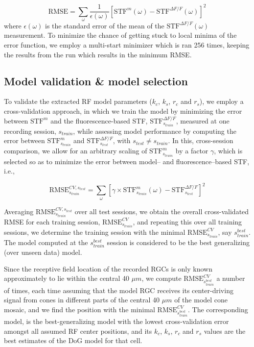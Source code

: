 \documentclass[11pt, oneside]{article}   	%
\begin{document}
\begin{equation}
\mbox{RMSE} = \displaystyle \sum_{\omega} \frac{1}{\epsilon({\omega})} {\left [  \mbox{STF}^{m}(\omega)  - \mbox{STF}^{\Delta F / F}(\omega) \right ] }^2
\end{equation}
where $\epsilon({\omega})$ is the standard error of the mean of the $\mbox{STF}^{\Delta F / F}(\omega)$ measurement. To minimize the chance of getting stuck to local minima of the error function, we employ a multi-start minimizer which is ran 256 times, keeping the results from the run which results in the minimum RMSE.


\subsection{Model validation \& model selection}
To validate the extracted RF model parameters ($k_c$, $k_s$, $r_c$ and $r_s$), we employ a cross-validation approach, in which we train the model by minimizing the error between $\mbox{STF}^{m}$ and the fluorescence-based STF, $\mbox{STF}^{\Delta F / F}_{s_{train}}$, measured at one recording session, $s_{train}$, while assessing model performance by computing the error between $\mbox{STF}^{m}_{s_{train}}$ and $\mbox{STF}^{\Delta F / F}_{s_{test}}$, with $s_{test} \ne  s_{train}$. In this, cross-session comparison, we allow for an arbitrary scaling of $\mbox{STF}^{m}_{s_{train}}$ by a factor $\gamma$, which is selected so as to minimize the error between model-- and  fluorescence--based STF, i.e., 

\begin{equation}
\mbox{RMSE}^{CV, s_{test}}_{s_{train}} = \sum_{\omega} \left [ \gamma \times \mbox{STF}^{m}_{s_{train}}(\omega) - \mbox{STF}^{\Delta F / F}_{s_{test}} \right ] ^2
\end{equation}

Averaging $\mbox{RMSE}^{CV, s_{test}}_{s_{train}}$ over all test sessions, we obtain the overall cross-validated RMSE for each training session, $\mbox{RMSE}^{CV}_{s_{train}}$, and repeating this over all training sessions, we determine the training session with the minimal $\mbox{RMSE}^{CV}_{s_{train}}$, say $s_{train}^{best}$. The model computed at the $s_{train}^{best}$ session is considered to be the best generalizing (over unseen data) model.


Since the receptive field location of the recorded RGCs is only known approximately to lie within the central 40 $\mu m$, we compute $\mbox{RMSE}^{CV}_{s_{train}^{best}}$ a number of times, each time assuming that the model RGC receives its center-driving signal from cones in different parts of the central 40 $\mu m$ of the model cone mosaic, and we find the position with the minimal $\mbox{RMSE}^{CV}_{s_{train}^{best}}$. The corresponding model, is the best-generalizing model with the lowest cross-validation error amongst all assumed RF center positions, and its $k_c$, $k_s$, $r_c$ and $r_s$ values are the best estimates of the DoG model for that cell.
\end{document}
